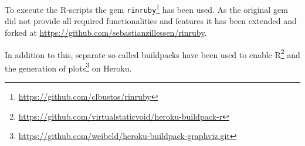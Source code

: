 To execute the \gls{R}-scripts the gem \texttt{rinruby}\footnote{\url{https://github.com/clbustos/rinruby}} has been used. As the original gem did not provide all required functionalities and features it has been extended and forked at \href{https://github.com/sebastianzillessen/rinruby}{https://github.com/sebastianzillessen/rinruby}. 

In addition to this, separate so called buildpacks have been used to enable \gls{R}\footnote{\url{https://github.com/virtualstaticvoid/heroku-buildpack-r}} and the generation of plots\footnote{\url{https://github.com/weibeld/heroku-buildpack-graphviz.git}} on Heroku. 


